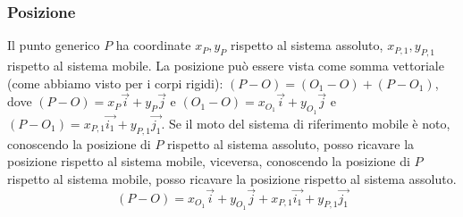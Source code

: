 \subsubsection{Posizione}
Il punto generico $P$ ha coordinate $x_P, y_P$ rispetto al sistema assoluto, $x_{P,1}, y_{P,1}$ rispetto al sistema mobile. \newline
La posizione può essere vista come somma vettoriale (come abbiamo visto per i corpi rigidi): $(P-O) = (O_1 - O) + (P-O_1)$, dove $(P-O) = x_P \vec{i} + y_P \vec{j}$ e $(O_1 - O) = x_{O_1} \vec{i} + y_{O_1} \vec{j}$ e $(P-O_1) = x_{P,1} \vec{i_1} + y_{P,1} \vec{j_1}$. Se il moto del sistema di riferimento mobile è noto, conoscendo la posizione di $P$ rispetto al sistema assoluto, posso ricavare la posizione rispetto al sistema mobile, viceversa, conoscendo la posizione di $P$ rispetto al sistema mobile, posso ricavare la posizione rispetto al sistema assoluto.
\[
    (P-O) = x_{O_1}\vec{i} + y_{O_1}\vec{j} + x_{P,1} \vec{i_1} + y_{P,1} \vec{j_1}
\]
